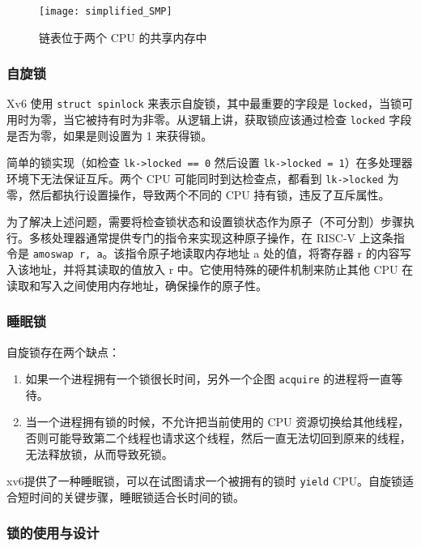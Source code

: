 \begin{figure}[!htb]
	\centering
	\texttt{[image: simplified\_SMP]}
	\caption{链表位于两个 CPU 的共享内存中}
	\label{fig:simplified_SMP}
\end{figure}

\subsubsection{自旋锁}

Xv6 使用 \texttt{struct spinlock} 来表示自旋锁，其中最重要的字段是 \texttt{locked}，当锁可用时为零，当它被持有时为非零。从逻辑上讲，获取锁应该通过检查 \texttt{locked} 字段是否为零，如果是则设置为 1 来获得锁。

简单的锁实现（如检查 \texttt{lk->locked == 0} 然后设置 \texttt{lk->locked = 1}）在多处理器环境下无法保证互斥。两个 CPU 可能同时到达检查点，都看到 \texttt{lk->locked} 为零，然后都执行设置操作，导致两个不同的 CPU 持有锁，违反了互斥属性。

为了解决上述问题，需要将检查锁状态和设置锁状态作为原子（不可分割）步骤执行。多核处理器通常提供专门的指令来实现这种原子操作，在 RISC-V 上这条指令是 \texttt{amoswap r, a}。该指令原子地读取内存地址 a 处的值，将寄存器 r 的内容写入该地址，并将其读取的值放入 r 中。它使用特殊的硬件机制来防止其他 CPU 在读取和写入之间使用内存地址，确保操作的原子性。

\subsubsection{睡眠锁}

自旋锁存在两个缺点：

\begin{enumerate}
	\item 如果一个进程拥有一个锁很长时间，另外一个企图 \texttt{acquire} 的进程将一直等待。
	\item 当一个进程拥有锁的时候，不允许把当前使用的 CPU 资源切换给其他线程，否则可能导致第二个线程也请求这个线程，然后一直无法切回到原来的线程，无法释放锁，从而导致死锁。
\end{enumerate}

xv6提供了一种睡眠锁，可以在试图请求一个被拥有的锁时 \texttt{yield} CPU。自旋锁适合短时间的关键步骤，睡眠锁适合长时间的锁。

\subsubsection{锁的使用与设计}

